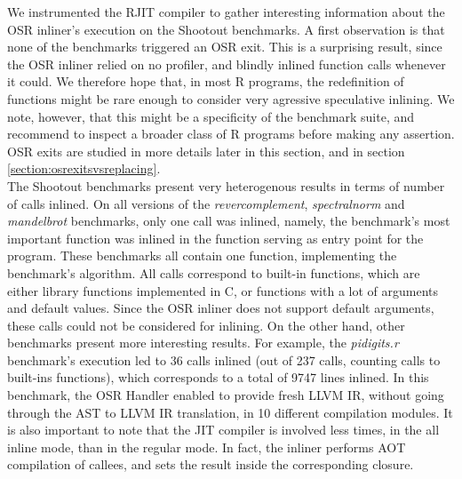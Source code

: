 We instrumented the RJIT compiler to gather interesting information about the OSR inliner's execution on the Shootout benchmarks.
A first observation is that none of the benchmarks triggered an OSR exit.
This is a surprising result, since the OSR inliner relied on no profiler, and blindly inlined function calls whenever it could.
We therefore hope that, in most R programs, the redefinition of functions might be rare enough to consider very agressive speculative inlining.
We note, however, that this might be a specificity of the benchmark suite, and recommend to inspect a broader class of R programs before making any assertion.
OSR exits are studied in more details later in this section, and in section \ref{section:osrexitsvsreplacing}.\\

The Shootout benchmarks present very heterogenous results in terms of number of calls inlined.
On all versions of the \textit{revercomplement}, \textit{spectralnorm} and \textit{mandelbrot} benchmarks, only one call was inlined, namely, the benchmark's most important function was inlined in the function serving as entry point for the program.
These benchmarks all contain one function, implementing the benchmark's algorithm.
All calls correspond to built-in functions, which are either library functions implemented in C, or functions with a lot of arguments and default values.
Since the OSR inliner does not support default arguments, these calls could not be considered for inlining.
On the other hand, other benchmarks present more interesting results. 
For example, the \textit{pidigits.r} benchmark's execution led to 36 calls inlined (out of 237 calls, counting calls to built-ins functions), which corresponds to a total of 9747 lines inlined.
In this benchmark, the OSR Handler enabled to provide fresh LLVM IR, without going through the AST to LLVM IR translation, in 10 different compilation modules.
It is also important to note that the JIT compiler is involved less times, in the all inline mode, than in the regular mode.
In fact, the inliner performs AOT compilation of callees, and sets the result inside the corresponding closure.\\

